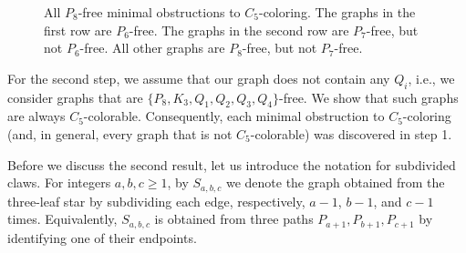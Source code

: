 \documentclass[11pt,a4paper]{article}
\theoremstyle{mystyle}
\begin{document}
\begin{figure}[h!]
\begin{center}
\end{center}
\caption{All $P_8$-free minimal obstructions to $C_5$-coloring. The graphs in the first row are $P_6$-free. The graphs in the second row are $P_7$-free, but not $P_6$-free. All other graphs are $P_8$-free, but not $P_7$-free.}
\label{fig:p8FreeObstructions}
\end{figure}



For the second step, we assume that our graph does not contain any $Q_i$, i.e., we consider graphs that are $\{P_8,K_3,Q_1,Q_2,Q_3,Q_4\}$-free. We show that such graphs are always $C_5$-colorable.
Consequently, each minimal obstruction to $C_5$-coloring (and, in general, every graph that is not $C_5$-colorable) was discovered in step 1. 

Before we discuss the second result, let us introduce the notation for subdivided claws. For integers $a,b,c \geq 1$, by $S_{a,b,c}$ we denote the graph obtained from the three-leaf star by subdividing each edge, respectively, $a-1$, $b-1$, and $c-1$ times.
Equivalently, $S_{a,b,c}$ is obtained from three paths $P_{a+1},P_{b+1},P_{c+1}$ by identifying one of their endpoints.
\end{document}
